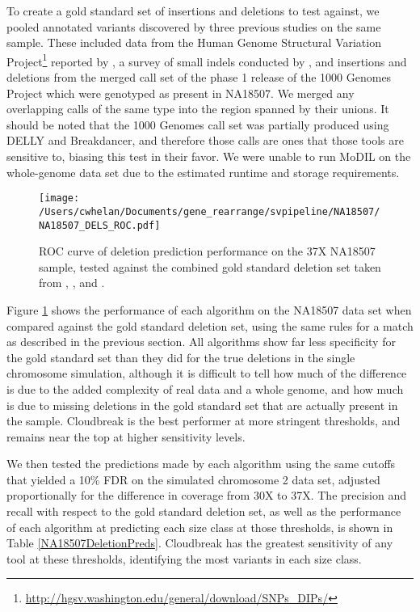 \documentclass[11pt]{article}
\begin{document}
To create a gold standard set of insertions and deletions to test against, we pooled annotated variants discovered by three previous studies on the same sample. These included data from the Human Genome Structural Variation Project\footnote{\url{http://hgsv.washington.edu/general/download/SNPs_DIPs/}} reported by \textcite{Kidd:2008p926}, a survey of small indels conducted by \textcite{Mills:2011fi}, and insertions and deletions from the merged call set of the phase 1 release of the 1000 Genomes Project \autocite{GenomesProjectConsortium:2012co} which were genotyped as present in NA18507. We merged any overlapping calls of the same type into the region spanned by their unions. It should be noted that the 1000 Genomes call set was partially produced using DELLY and Breakdancer, and therefore those calls are ones that those tools are sensitive to, biasing this test in their favor. We were unable to run MoDIL on the whole-genome data set due to the estimated runtime and storage requirements.

\begin{figure}[t]
\centering
\texttt{[image: /Users/cwhelan/Documents/gene\_rearrange/svpipeline/NA18507/NA18507\_DELS\_ROC.pdf]}
\caption{ROC curve of deletion prediction performance on the 37X NA18507 sample, tested against the combined gold standard deletion set taken from \textcite{Kidd:2008p926}, \textcite{Mills:2011fi}, and \textcite{GenomesProjectConsortium:2012co}.}
\label{NA18507DeletionsRoc}
\end{figure}

Figure \ref{NA18507DeletionsRoc} shows the performance of each algorithm on the NA18507 data set when compared against the gold standard deletion set, using the same rules for a match as described in the previous section. All algorithms show far less specificity for the gold standard set than they did for the true deletions in the single chromosome simulation, although it is difficult to tell how much of the difference is due to the added complexity of real data and a whole genome, and how much is due to missing deletions in the gold standard set that are actually present in the sample. Cloudbreak is the best performer at more stringent thresholds, and remains near the top at higher sensitivity levels.

We then tested the predictions made by each algorithm using the same cutoffs that yielded a 10\% FDR on the simulated chromosome 2 data set, adjusted proportionally for the difference in coverage from 30X to 37X. The precision and recall with respect to the gold standard deletion set, as well as the performance of each algorithm at predicting each size class at those thresholds, is shown in Table \ref{NA18507DeletionPreds}. Cloudbreak has the greatest sensitivity of any tool at these thresholds, identifying the most variants in each size class.
\end{document}
